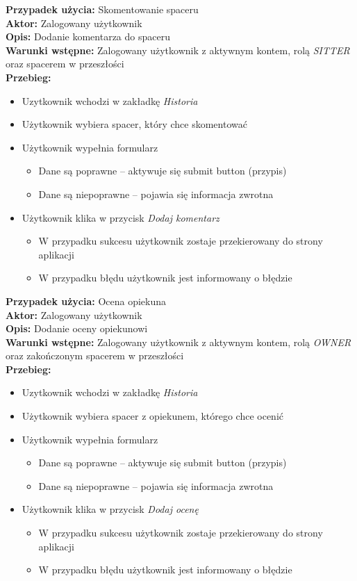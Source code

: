 \noindent
\textbf{Przypadek użycia:}  Skomentowanie spaceru\\
\textbf{Aktor:} Zalogowany użytkownik\\
\textbf{Opis:} Dodanie komentarza do spaceru\\
\textbf{Warunki wstępne:} Zalogowany użytkownik z aktywnym kontem, rolą \textit{SITTER} oraz spacerem w przeszłości\\
\textbf{Przebieg:}
\begin{itemize}
    \item Uzytkownik wchodzi w zakładkę \textit{Historia}
    \item Użytkownik wybiera spacer, który chce skomentować
    \item Użytkownik wypełnia formularz
    \begin{itemize}
        \item Dane są poprawne -- aktywuje się submit button (przypis)
        \item Dane są niepoprawne -- pojawia się informacja zwrotna
    \end{itemize}
    \item Użytkownik klika w przycisk \textit{Dodaj komentarz}
    \begin{itemize}
        \item W przypadku sukcesu użytkownik zostaje przekierowany do strony aplikacji
        \item W przypadku błędu użytkownik jest informowany o błędzie
    \end{itemize}
\end{itemize}

\noindent
\textbf{Przypadek użycia:} Ocena opiekuna\\
\textbf{Aktor:} Zalogowany użytkownik\\
\textbf{Opis:} Dodanie oceny opiekunowi\\
\textbf{Warunki wstępne:}  Zalogowany użytkownik z aktywnym kontem, rolą \textit{OWNER} oraz zakończonym spacerem w przeszłości\\
\textbf{Przebieg:}
\begin{itemize}
    \item Uzytkownik wchodzi w zakładkę \textit{Historia}
    \item Użytkownik wybiera spacer z opiekunem, którego chce ocenić
    \item Użytkownik wypełnia formularz
    \begin{itemize}
        \item Dane są poprawne -- aktywuje się submit button (przypis)
        \item Dane są niepoprawne -- pojawia się informacja zwrotna
    \end{itemize}
    \item Użytkownik klika w przycisk \textit{Dodaj ocenę}
    \begin{itemize}
        \item W przypadku sukcesu użytkownik zostaje przekierowany do strony aplikacji
        \item W przypadku błędu użytkownik jest informowany o błędzie
    \end{itemize}
\end{itemize}

